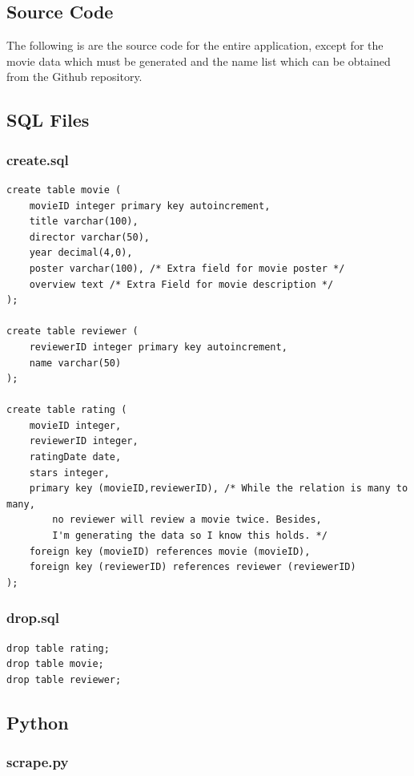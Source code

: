 \documentclass[10pt,a4paper]{scrreprt}
\begin{document}
\begin{appendices}
\chapter{Source Code}
The following is are the source code for the entire application, except for the movie data which must be generated and the name list which can be obtained from the Github repository.

\section{SQL Files}
\subsection{create.sql}

\begin{verbatim}
create table movie (
    movieID integer primary key autoincrement,
    title varchar(100),
    director varchar(50),
    year decimal(4,0),
    poster varchar(100), /* Extra field for movie poster */
    overview text /* Extra Field for movie description */
);

create table reviewer (
    reviewerID integer primary key autoincrement,
    name varchar(50)
);

create table rating (
    movieID integer,
    reviewerID integer,
    ratingDate date,
    stars integer,
    primary key (movieID,reviewerID), /* While the relation is many to many,
        no reviewer will review a movie twice. Besides,
        I'm generating the data so I know this holds. */
    foreign key (movieID) references movie (movieID),
    foreign key (reviewerID) references reviewer (reviewerID)
);
\end{verbatim}

\subsection{drop.sql}

\begin{verbatim}
drop table rating;
drop table movie;
drop table reviewer;
\end{verbatim}

\section{Python}
\subsection{scrape.py}


\end{appendices}
\end{document}
